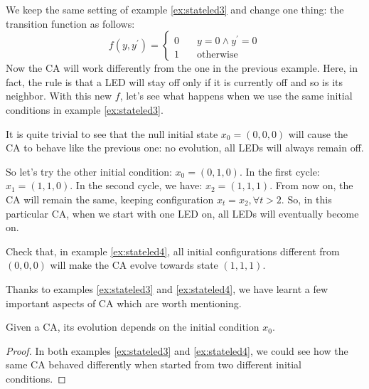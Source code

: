 \begin{example}
\label{ex:stateled4}
We keep the same setting of example \ref{ex:stateled3} and change one thing: the transition function
as follows:
\begin{equation*}
f \left( y, y^\prime \right) =
  \begin{cases}
    0       & \quad y = 0 \wedge y^\prime = 0\\
    1       & \quad \text{otherwise}
  \end{cases}
\end{equation*}
Now the CA will work differently from the one in the previous example. Here, in fact, the rule is
that a LED will stay off only if it is currently off and so is its neighbor. With this
new $f$, let's see what happens when we use the same initial conditions in example \ref{ex:stateled3}.

It is quite trivial to see that the null initial state $x_0 = (0,0,0)$ will cause the CA to behave
like the previous one: no evolution, all LEDs will always remain off.

So let's try the other initial condition: $x_0 = (0,1,0)$. In the first cycle: $x_1 = (1,1,0)$.
In the second cycle, we have: $x_2 = (1,1,1)$. From now on, the CA will remain the same, keeping
configuration $x_t = x_2, \forall t > 2$. So, in this particular CA, when we start with one LED on,
all LEDs will eventually become on.
\end{example}

\begin{problem}
\label{prob:evolvetoward111}
Check that, in example \ref{ex:stateled4}, all initial configurations different from $(0,0,0)$ will
make the CA evolve towards state $(1,1,1)$.
\end{problem}

Thanks to examples \ref{ex:stateled3} and \ref{ex:stateled4}, we have learnt a few important
aspects of CA which are worth mentioning.

\begin{theorem}
\label{theo:evinitcond}
Given a CA, its evolution depends on the initial condition $x_0$.
\begin{proof}
In both examples \ref{ex:stateled3} and \ref{ex:stateled4}, we could see how the same CA behaved
differently when started from two different initial conditions.
\end{proof}
\end{theorem}

